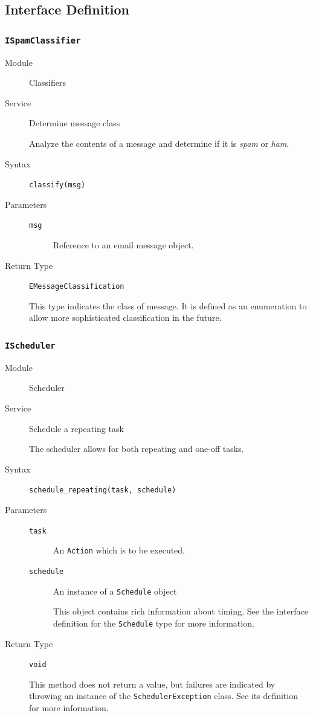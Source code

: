 \documentclass[letterpaper,11pt]{article}
\begin{document}
\subsection{Interface Definition}
\label{sec:interface}
\subsubsection{\texttt{ISpamClassifier}}
\begin{description}
\item[Module] Classifiers
\item[Service] Determine message class

  Analyze the contents of a message and determine if it is \textit{spam} or
  \textit{ham}.
\item[Syntax] \texttt{classify(msg)}
\item[Parameters] \hfill
  \begin{description}
  \item[\texttt{msg}] Reference to an email message object.
  \end{description}
\item[Return Type] \texttt{EMessageClassification}

  This type indicates the class of message.  It is defined as an enumeration
  to allow more sophisticated classification in the future.
\end{description}

\subsubsection{\texttt{IScheduler}}
\begin{description}
\item[Module] Scheduler
\item[Service] Schedule a repeating task

  The scheduler allows for both repeating and one-off tasks.
\item[Syntax] \texttt{schedule\_repeating(task, schedule)}
\item[Parameters] \hfill
  \begin{description}
  \item[\texttt{task}] An \texttt{Action} which is to be executed.
  \item[\texttt{schedule}] An instance of a \texttt{Schedule} object

    This object contains rich information about timing.  See the interface
    definition for the \texttt{Schedule} type for more information.
  \end{description}
\item[Return Type] \texttt{void}

  This method does not return a value, but failures are indicated by throwing
  an instance of the \texttt{SchedulerException} class.  See its definition
  for more information.
\end{description}
\end{document}
